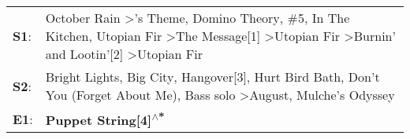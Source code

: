 \begin{supertabular}{p{0.03\textwidth}p{0.92\textwidth}}
 \textbf{S1}:  &  October Rain\textsuperscript{} \textgreater {}'s Theme\textsuperscript{}, \enspace Domino Theory\textsuperscript{}, \enspace \#5\textsuperscript{}, \enspace In The Kitchen\textsuperscript{}, \enspace Utopian Fir\textsuperscript{} \textgreater \enspace The Message[1]\textsuperscript{} \textgreater \enspace Utopian Fir\textsuperscript{} \textgreater \enspace Burnin' and Lootin'[2]\textsuperscript{} \textgreater \enspace Utopian Fir\textsuperscript{}  \enspace  \\
 \textbf{S2}:  &                                                                                                                                                        Bright Lights, Big City\textsuperscript{}, \enspace Hangover[3]\textsuperscript{}, \enspace Hurt Bird Bath\textsuperscript{}, \enspace Don't You (Forget About Me)\textsuperscript{}, \enspace Bass solo\textsuperscript{} \textgreater \enspace August\textsuperscript{}, \enspace Mulche's Odyssey\textsuperscript{}  \enspace  \\
 \textbf{E1}:  &                                                                                                                                                                                                                                                                                                                                                                                                                          \textbf{Puppet String[4]\textsuperscript{$\wedge$*}}  \enspace  \\
\end{supertabular}
